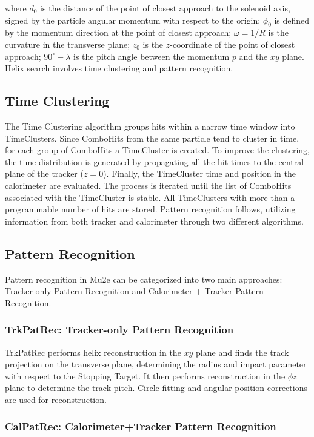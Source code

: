 where $d_0$ is the distance of the point of closest approach to the solenoid axis, 
signed by the particle angular momentum with respect to the origin; $\phi_0$ is 
defined by the momentum direction at the point of closest approach; $\omega = 1/R$ 
is the curvature in the transverse plane; $z_0$ is the $z$-coordinate of the point of 
closest approach; $90^\circ - \lambda$ is the pitch angle between the momentum $p$ and 
the $xy$ plane. Helix search involves time clustering and pattern recognition.

\subsection{Time Clustering}

The Time Clustering algorithm groups hits within a narrow time window into TimeClusters. 
Since ComboHits from the same particle tend to cluster in time, for each group of ComboHits a 
TimeCluster is created. To improve the clustering, the time distribution is generated by 
propagating all the hit times to the central plane of the tracker ($z=0$). Finally, the 
TimeCluster time and position in the calorimeter are evaluated. The process is iterated 
until the list of ComboHits associated with the TimeCluster is stable. All TimeClusters with 
more than a programmable number of hits are stored. Pattern recognition follows, utilizing 
information from both tracker and calorimeter through two different algorithms.
\subsection{Pattern Recognition}

Pattern recognition in Mu2e can be categorized into two main approaches: 
Tracker-only Pattern Recognition and Calorimeter + Tracker Pattern Recognition.

\subsubsection{TrkPatRec: Tracker-only Pattern Recognition}

TrkPatRec performs helix reconstruction in the $xy$ plane and finds the 
track projection on the transverse plane, determining the radius and impact 
parameter with respect to the Stopping Target. It then performs reconstruction 
in the $\phi z$ plane to determine the track pitch. Circle fitting and angular 
position corrections are used for reconstruction.

\subsubsection{CalPatRec: Calorimeter+Tracker Pattern Recognition}

